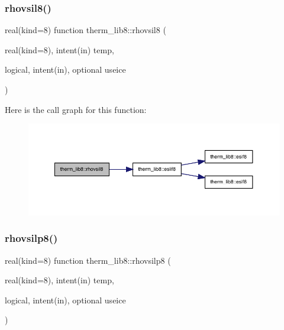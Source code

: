 \subsubsection{\texorpdfstring{rhovsil8()}{rhovsil8()}}
{\footnotesize\ttfamily real(kind=8) function therm\+\_\+lib8\+::rhovsil8 (\begin{DoxyParamCaption}\item[{real(kind=8), intent(in)}]{temp,  }\item[{logical, intent(in), optional}]{useice }\end{DoxyParamCaption})}

Here is the call graph for this function\+:
\nopagebreak
\begin{figure}[H]
\begin{center}
\leavevmode
\includegraphics[width=350pt]{namespacetherm__lib8_ac356df009ed9ba07965dde7292121e0c_cgraph}
\end{center}
\end{figure}
\mbox{\label{namespacetherm__lib8_a3700047f1dd386e992cb13e626018656}} 
\subsubsection{\texorpdfstring{rhovsilp8()}{rhovsilp8()}}
{\footnotesize\ttfamily real(kind=8) function therm\+\_\+lib8\+::rhovsilp8 (\begin{DoxyParamCaption}\item[{real(kind=8), intent(in)}]{temp,  }\item[{logical, intent(in), optional}]{useice }\end{DoxyParamCaption})}

